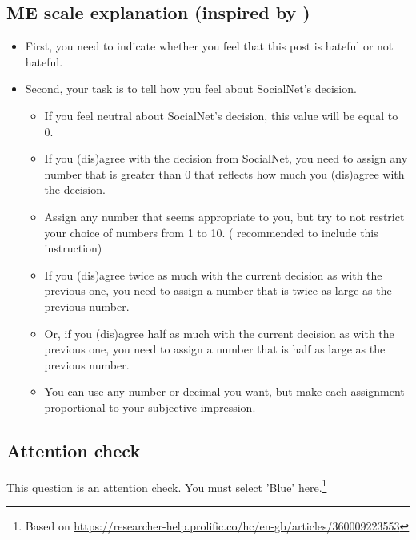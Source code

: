 \documentclass[a4paper]{article}
\begin{document}
\subsection{ME scale explanation (inspired by \cite{moskowitz1977magnitude})}
\begin{itemize}
    \item First, you need to indicate whether you feel that this post is hateful or not hateful.
    \item Second, your task is to tell how you feel about SocialNet's decision.
          \begin{itemize}
              \item If you feel neutral about SocialNet's decision, this value will be equal to 0.
              \item If you (dis)agree with the decision from SocialNet, you need to assign any number that is greater than 0 that reflects how much you (dis)agree with the decision.
              \item Assign any number that seems appropriate to you, but try to not restrict your choice of numbers from 1 to 10. (\cite{bard1996magnitude} recommended to include this instruction)
              \item If you (dis)agree twice as much with the current decision as with the previous one, you need to assign a number that is twice as large as the previous number.
              \item Or, if you (dis)agree half as much with the current decision as with the previous one, you need to assign a number that is half as large as the previous number.
              \item You can use any number or decimal you want, but make each assignment proportional to your subjective impression.
          \end{itemize}
\end{itemize}

\subsection{Attention check}
This question is an attention check. You must select 'Blue' here.\footnote{Based on \url{https://researcher-help.prolific.co/hc/en-gb/articles/360009223553}}
\end{document}
